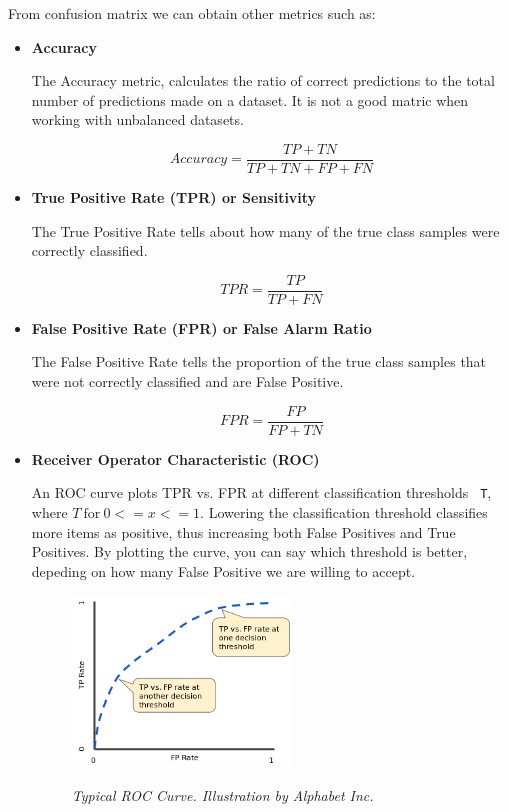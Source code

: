 From confusion matrix we can obtain other metrics such as:

\begin{itemize}

  \item {\bf Accuracy}

    The Accuracy metric, calculates the ratio of correct predictions to the total number of
    predictions made on a dataset. It is not a good matric when working with
    unbalanced datasets.

    \[Accuracy = \frac{TP + TN}{TP + TN + FP + FN}\]

  \item {\bf True Positive Rate (TPR) or Sensitivity}

    The True Positive Rate tells about how many of the true class samples were
    correctly classified.

    \[TPR = \frac{TP}{TP + FN}\]


  \item {\bf False Positive Rate (FPR) or False Alarm Ratio}

    The False Positive Rate tells the proportion of the true class samples that
    were not correctly classified and are False Positive.

    \[FPR = \frac{FP}{FP + TN}\]


  \item {\bf Receiver Operator Characteristic (ROC)}

	  An ROC curve plots TPR vs. FPR at different classification thresholds {\tt
	  T}, where $T \ \text{for} \ 0 <= x <= 1$. Lowering the classification
	  threshold classifies more items as positive, thus increasing both False
	  Positives and True Positives. By plotting the curve, you can say which
	  threshold is better, depeding on how many False Positive we are willing to
	  accept.

    \begin{figure}[H]
      \centering
      \begin{adjustbox}{trim={0pt 0cm 0pt 0cm}, clip}
        \centering
        \includegraphics[width=0.55\textwidth]{imatges/validation-strategy/ROCCurve.png}
      \end{adjustbox}
        \caption{\textit{Typical ROC Curve. Illustration by Alphabet Inc.}}
      {\label{fig:ROCCurve}}
    \end{figure}



\end{itemize}
